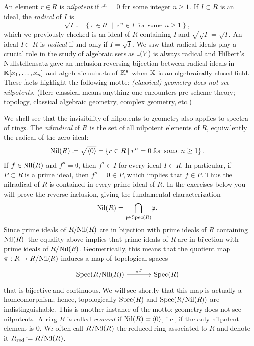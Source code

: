 \documentclass[Notebook.tex]{subfiles}
\begin{document}
\newpage 

\hrulefill

An element $r\in R$ is \emph{nilpotent} if $r^n=0$ for some integer $n\geq 1$. If $ I \subset R$ is an ideal, the \emph{radical} of $I$ is
\[
\sqrt{I}\coloneqq\left\{r\in R\;\middle|\; r^n\in I\text{ for some }n\geq 1\right\},
\]
which we previously checked is an ideal of $R$ containing $I$ and $\sqrt{\sqrt{I}}=\sqrt{I}$. An ideal $I \subset R$ is \emph{radical} if and only if $I=\sqrt{I}$. We saw that radical ideals play a crucial role in the study of algebraic sets as $\mathbb I(V)$ is always radical and Hilbert's Nullstellensatz gave an inclusion-reversing bijection between radical ideals in $\mathbb K[x_1,\ldots,x_n]$ and algebraic subsets of $\mathbb K^n$ when $\mathbb K$ is an algebraically closed field. These facts highlight the following motto: \emph{(classical) geometry does not see nilpotents.} (Here classical means anything one encounters pre-scheme theory; topology, classical algebraic geometry, complex geometry, etc.)

We shall see that the invisibility of nilpotents to geometry also applies to spectra of rings. The \emph{nilradical} of $R$ is the set of all nilpotent elements of $R$, equivalently the radical of the zero ideal:
\[
\text{Nil}(R)\coloneqq\sqrt{\langle 0\rangle}=\left\{r\in R\;\middle|\; r^n=0\text{ for some }n\geq 1\right\}.
\]
If $f \in \text{Nil}(R)$ and $f^{n}=0$, then $f^{n}\in I$ for every ideal $I \subset R$. In particular, if $P \subset R$ is a prime ideal, then $f^{n}=0\in P$, which implies that $f\in P$. Thus the nilradical of $R$ is contained in every prime ideal of $R$. In the exercises below you will prove the reverse inclusion, giving the fundamental characterization
\[
\text{Nil}(R)=\bigcap_{\mathfrak{p}\in\operatorname{Spec}(R)}\mathfrak{p}.
\]
Since prime ideals of $R/\text{Nil}(R)$ are in bijection with prime ideals of $R$ containing $\text{Nil}(R)$, the equality above implies that prime ideals of $R$ are in bijection with prime ideals of $R/\text{Nil}(R)$. Geometrically, this means that the quotient map $\pi:R \to R/\text{Nil}(R)$ induces a map of topological spaces
\[
\begin{tikzcd}[row sep = .5em, column sep = 3.5em]
    \Spec(R/\Nil(R)) \arrow[r, "\pi^{\#}"] & \Spec(R)
\end{tikzcd}
\]
that is bijective and continuous. We will see shortly that this map is actually a homeomorphism; hence, topologically $\operatorname{Spec}(R)$ and $\operatorname{Spec}(R/\text{Nil}(R))$ are indistinguishable. This is another instance of the motto: geometry does not see nilpotents. A ring $R$ is called \emph{reduced} if $\text{Nil}(R)=\langle 0 \rangle$, i.e., if the only nilpotent element is $0$. We often call $R/\text{Nil}(R)$ the reduced ring associated to $R$ and denote it $R_{\text{red}}\coloneqq R/\text{Nil}(R)$.
\end{document}
